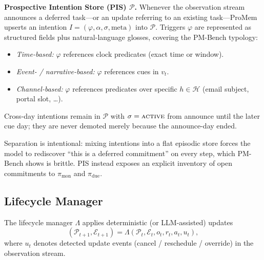 \noindent\textbf{Prospective Intention Store (PIS) $\mathcal{P}$.}
Whenever the observation stream announces a deferred task---or an update referring to an existing task---ProMem upserts an intention $I=(\varphi,\alpha,\sigma,\mathrm{meta})$ into $\mathcal{P}$. Triggers $\varphi$ are represented as structured fields plus natural-language glosses, covering the PM-Bench typology:
\begin{itemize}
    \item \emph{Time-based:} $\varphi$ references clock predicates (exact time or window).
    \item \emph{Event- / narrative-based:} $\varphi$ references cues in $v_t$.
    \item \emph{Channel-based:} $\varphi$ references predicates over specific $h\in\mathcal{H}$ (email subject, portal slot, \ldots).
\end{itemize}
Cross-day intentions remain in $\mathcal{P}$ with $\sigma=\textsc{active}$ from announce until the later cue day; they are never demoted merely because the announce-day ended.

Separation is intentional: mixing intentions into a flat episodic store forces the model to rediscover ``this is a deferred commitment'' on every step, which PM-Bench shows is brittle. PIS instead exposes an explicit inventory of open commitments to $\pi_{\mathrm{mon}}$ and $\pi_{\mathrm{due}}$.

\subsection{Lifecycle Manager}
\label{sec:lifecycle}

The lifecycle manager $\Lambda$ applies deterministic (or LLM-assisted) updates
\begin{equation}
(\mathcal{P}_{t+1},\mathcal{E}_{t+1})=\Lambda(\mathcal{P}_t,\mathcal{E}_t,o_t,r_t,a_t,u_t),
\end{equation}
where $u_t$ denotes detected update events (cancel / reschedule / override) in the observation stream.

